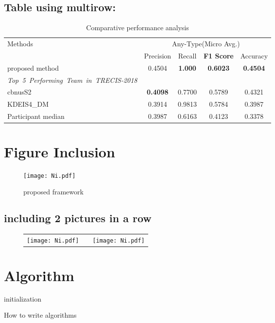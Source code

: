 \documentclass{article}
\begin{document}
\subsection{Table using multirow:}
\begin{table}[h]
\centering
\caption{Comparative performance analysis}
\begin{tabular}{lcccc}
\toprule
\multirow{2}[3]{*}{Methods}  & \multicolumn{4}{c}{Any-Type(Micro Avg.)}\\
\cmidrule{2-5} & Precision & Recall & \textbf{F1 Score} & Accuracy\\
\midrule
proposed method & 0.4504 & \textbf{1.000 } & \textbf{0.6023} & \textbf{0.4504}\\
\midrule
\textit{\mbox{Top 5 Performing Team in TRECIS-2018}}\\
\midrule
cbnusS2 &\textbf{ 0.4098} & 0.7700 & 0.5789 & 0.4321\\
KDEIS4\_DM & 0.3914 & 0.9813 & 0.5784 & 0.3987\\
\midrule
Participant median & 0.3987 & 0.6163 & 0.4123 & 0.3378\\
\bottomrule
\end{tabular}
\end{table}

\section{Figure Inclusion}
\begin{figure}[!htb]
\centering
\texttt{[image: Ni.pdf]}
 \caption{proposed framework}
 \label{fig:ggplot}
\end{figure}

\subsection{including 2 pictures in a row}
\begin{figure}[H]
\centering
\begin{tabular}{cp{0.5cm}c}
\texttt{[image: Ni.pdf]} &
&\texttt{[image: Ni.pdf]}
\end{tabular}
\end{figure}

\section{Algorithm}
\begin{algorithm}[H]
\SetAlgoLined
{}
 initialization\;
\caption{How to write algorithms}
\end{algorithm}
\end{document}
